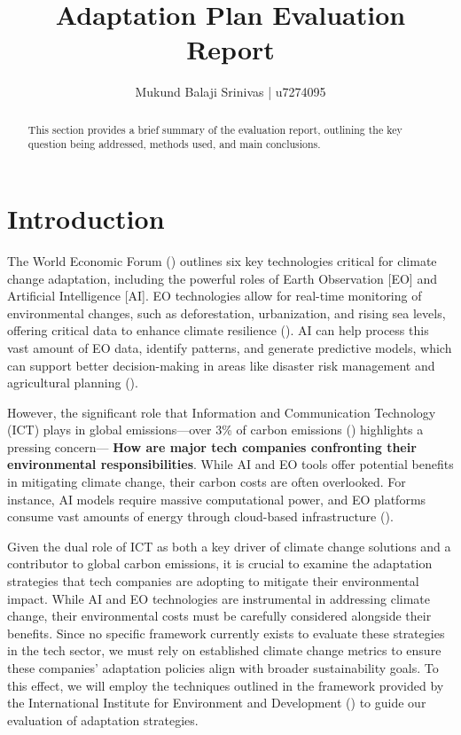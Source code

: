 \documentclass[12pt]{article}
\title{Adaptation Plan Evaluation Report}
\author{Mukund Balaji Srinivas | u7274095}
\date{} %
\begin{document}
\maketitle

\begin{abstract}
This section provides a brief summary of the evaluation report, outlining the key question being addressed, methods used, and main conclusions.
\end{abstract}

\newpage

\section*{Introduction}

The World Economic Forum (\cite{masterson_2024})  outlines six key technologies critical for climate change adaptation, including the powerful roles of Earth Observation [EO] and Artificial Intelligence [AI]. EO technologies allow for real-time monitoring of environmental changes, such as deforestation, urbanization, and rising sea levels, offering critical data to enhance climate resilience (\cite{anderson_2017}). AI can help process this vast amount of EO data, identify patterns, and generate predictive models, which can support better decision-making in areas like disaster risk management and agricultural planning (\cite{Huntingford_2019}).

However, the significant role that Information and Communication Technology (ICT) plays in global emissions—over 3\% of carbon emissions (\cite{jones_2018}) highlights a pressing concern— \textbf{How are major tech companies confronting their environmental responsibilities}. While AI and EO tools offer potential benefits in mitigating climate change, their carbon costs are often overlooked. For instance, AI models require massive computational power, and EO platforms consume vast amounts of energy through cloud-based infrastructure (\cite{taddeo_2021}).

Given the dual role of ICT as both a key driver of climate change solutions and a contributor to global carbon emissions, it is crucial to examine the adaptation strategies that tech companies are adopting to mitigate their environmental impact. While AI and EO technologies are instrumental in addressing climate change, their environmental costs must be carefully considered alongside their benefits. Since no specific framework currently exists to evaluate these strategies in the tech sector, we must rely on established climate change metrics to ensure these companies' adaptation policies align with broader sustainability goals. To this effect, we will employ the techniques outlined in the framework provided by the International Institute for Environment and Development (\cite{craft_2016})  to guide our evaluation of adaptation strategies.
\end{document}
